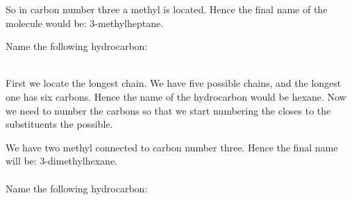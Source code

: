 \documentclass[main.tex]{subfiles}
\begin{document}
\begin{description}
So in carbon number three a methyl is located. Hence the final name of the molecule would be: 3-methylheptane.



\begin{example} %
Name the following hydrocarbon:
\begin{center}  \end{center}
\\
First we locate the longest chain. We have five possible chains, and the longest one has six carbons. Hence the name of the hydrocarbon would be hexane. Now we need to number the carbons so that we start numbering the closes to the substituents the possible.
\begin{center}  \end{center}\vspace{0.5cm}
We have two methyl connected to carbon number three. Hence the final name will be: 3-dimethylhexane.
\\
\faDiamond\ \\
Name the following hydrocarbon:
\begin{center}  \end{center}
\end{example}%



\end{description}
\end{document}
